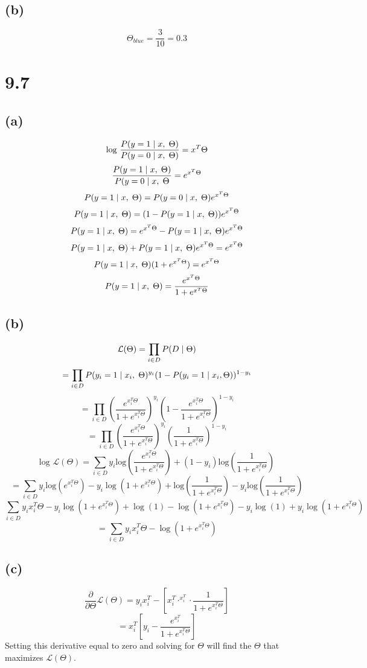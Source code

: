 \documentclass[11pt]{article}
\newcommand{\given}{\hspace{1mm}|\hspace{1mm}}
\newcommand{\hsp}{\hspace{1mm}}
\begin{document}
\subsection*{(b)}
\[\Theta_{blue}=\frac{3}{10}=0.3\]
\section*{9.7}
\subsection*{(a)}
\[\text{log }\frac{P(y=1\given x,\hsp\Theta)}{P(y=0\given x,\hsp\Theta)}=x^T\Theta\]
\[\frac{P(y=1\given x,\hsp\Theta)}{P(y=0\given x,\hsp\Theta}=e^{x^T\Theta}\]
\[P(y=1\given x,\hsp\Theta)=P(y=0\given x,\hsp\Theta)e^{x^T\Theta}\]
\[P(y=1\given x,\hsp\Theta)=(1-P(y=1\given x,\hsp\Theta))e^{x^T\Theta}\]
\[P(y=1\given x,\hsp\Theta)=e^{x^T\Theta}-P(y=1\given x,\hsp\Theta)e^{x^T\Theta}\]
\[P(y=1\given x,\hsp\Theta)+P(y=1\given x,\hsp\Theta)e^{x^T\Theta}=e^{x^T\Theta}\]
\[P(y=1\given x,\hsp\Theta)(1+e^{x^T\Theta})=e^{x^T\Theta}\]
\[P(y=1\given x,\hsp\Theta)=\frac{e^{x^T\Theta}}{1+e^{x^T\Theta}}\]
\subsection*{(b)}
\[\mathcal{L}(\Theta)=\prod_{i\in D}P(D\given \Theta)\]
\[=\prod_{i\in D}P(y_i=1\given x_i,\hsp\Theta)^{y_i}(1-P(y_i=1\given x_i,\Theta))^{1-y_i}\]
\[=\prod_{i\in D}\left(\frac{e^{x_i^T\Theta}}{1+e^{x_i^T\Theta}}\right)^{y_i}\left(1-\frac{e^{x_i^T\Theta}}{1+e^{x_i^T\Theta}}\right)^{1-y_i}\]
\[=\prod_{i\in D}\left(\frac{e^{x_i^T\Theta}}{1+e^{x_i^T\Theta}}\right)^{y_i}\left(\frac{1}{1+e^{x_i^T\Theta}}\right)^{1-y_i}\]
\[\text{log }\mathcal{L}(\Theta)=\sum_{i\in D}{y_i\text{log}\left(\frac{e^{x_i^T\Theta}}{1+e^{x_i^T\Theta}}\right)+(1-y_i)\text{log}\left(\frac{1}{1+e^{x_i^T\Theta}}\right)}\]
\[=\sum_{i\in D}{y_i\text{log}(e^{x_i^T\Theta})-y_i\log(1+e^{x_i^T\Theta})+\text{log}\left(\frac{1}{1+e^{x_i^T\Theta}}\right)-y_i\text{log}\left(\frac{1}{1+e^{x_i^T\Theta}}\right)}\]
\[\sum_{i\in D}{y_ix_i^T\Theta-y_i\log(1+e^{x_i^T\Theta})+\log(1)-\log(1+e^{x_i^T\Theta})-y_i\log(1)+y_i\log(1+e^{x_i^T\Theta})}\]
\[=\sum_{i\in D}{y_ix_i^T\Theta-\log(1+e^{x_i^T\Theta})}\]
\clearpage
\subsection*{(c)}
\[\frac{\partial}{\partial\Theta}\mathcal{L}(\Theta)=y_ix_i^T-\left[x_i^T\cdot^{x_i^T}\cdot\frac{1}{1+e^{x_i^T\Theta}}\right]\]
\[=x_i^T\left[y_i-\frac{e^{x_i^T}}{1+e^{x_i^T\Theta}}\right]\]
Setting this derivative equal to zero and solving for $\Theta$ will find the $\Theta$ that maximizes $\mathcal{L}(\Theta)$.
\end{document}
